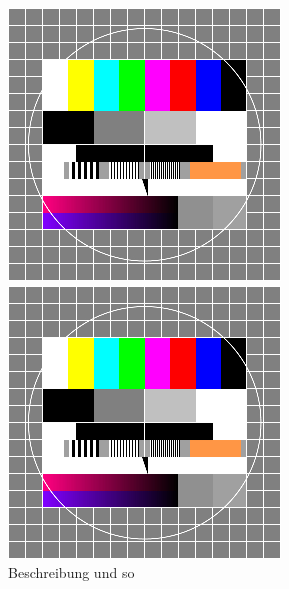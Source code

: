 \documentclass[
12pt, %
toc=listofnumbered, %
toc=chapterentrydotfill, %
numbers=noenddot, %
captions=tableheading, %
bibliography=numbered
]{scrreprt}
\begin{document}
\begin{figure}
	\centering
	\begin{minipage}[b]{.4\linewidth} %
		\includegraphics[width=\linewidth]{./images/0_testbild.png}
		\caption{Beschreibung und so}
		\label{fig:testbild_klein_links}
	\end{minipage}
	\hspace{.1\linewidth}%
	\begin{minipage}[b]{.4\linewidth} %
		\includegraphics[width=\linewidth]{./images/0_testbild.png}

\end{minipage}
\end{figure}
\end{document}
